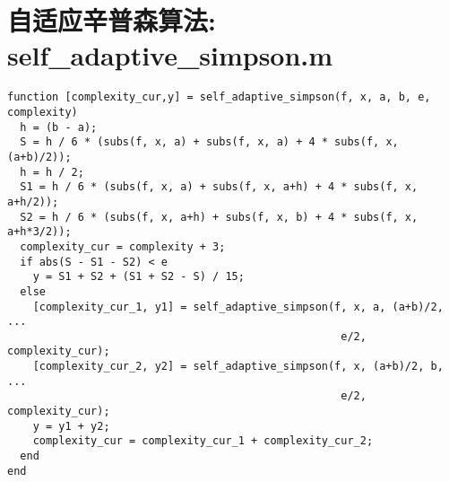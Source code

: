 \section*{自适应辛普森算法: self\_adaptive\_simpson.m}
\lstset{language=Matlab}
\begin{lstlisting}
function [complexity_cur,y] = self_adaptive_simpson(f, x, a, b, e, complexity)
  h = (b - a);
  S = h / 6 * (subs(f, x, a) + subs(f, x, a) + 4 * subs(f, x, (a+b)/2));
  h = h / 2;
  S1 = h / 6 * (subs(f, x, a) + subs(f, x, a+h) + 4 * subs(f, x, a+h/2));
  S2 = h / 6 * (subs(f, x, a+h) + subs(f, x, b) + 4 * subs(f, x, a+h*3/2));
  complexity_cur = complexity + 3;
  if abs(S - S1 - S2) < e
    y = S1 + S2 + (S1 + S2 - S) / 15;
  else 
    [complexity_cur_1, y1] = self_adaptive_simpson(f, x, a, (a+b)/2, ...
                                                    e/2, complexity_cur);
    [complexity_cur_2, y2] = self_adaptive_simpson(f, x, (a+b)/2, b, ...
                                                    e/2, complexity_cur);
    y = y1 + y2;
    complexity_cur = complexity_cur_1 + complexity_cur_2;
  end
end
\end{lstlisting}
